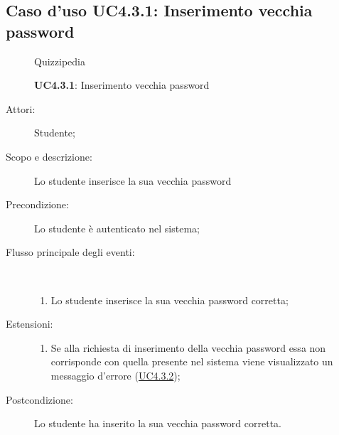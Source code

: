 \subsection{Caso d'uso UC4.3.1: Inserimento vecchia password}
\begin{figure}[H]
	\centering
	\begin{resizedtikzpicture}{\textwidth}
		\begin{umlsystem}[x=0, fill=lightgray!20]{Quizzipedia}
		\end{umlsystem}
	\end{resizedtikzpicture}
	\caption{\textbf{UC4.3.1}: Inserimento vecchia password}
	\label{UC4.3.1}
\end{figure}
\begin{description}
	\item[Attori:] Studente;
	\item[Scopo e descrizione:] Lo studente inserisce la sua vecchia password
	\item[Precondizione:] Lo studente è autenticato nel sistema;
	
	\item[Flusso principale degli eventi:] \ 
	\begin{enumerate}
		\item Lo studente inserisce la sua vecchia password corretta;
		
	\end{enumerate}
	\item[Estensioni:]
	\begin{enumerate}
		\item Se alla richiesta di inserimento della vecchia password essa non corrisponde con quella presente nel sistema viene visualizzato un messaggio d'errore (\hyperlink{UC4.3.2}{UC4.3.2});
		
	\end{enumerate}
	\item[Postcondizione:] Lo studente ha inserito la sua vecchia password corretta.
\end{description}
\hypertarget{UC4.3.2}{}
